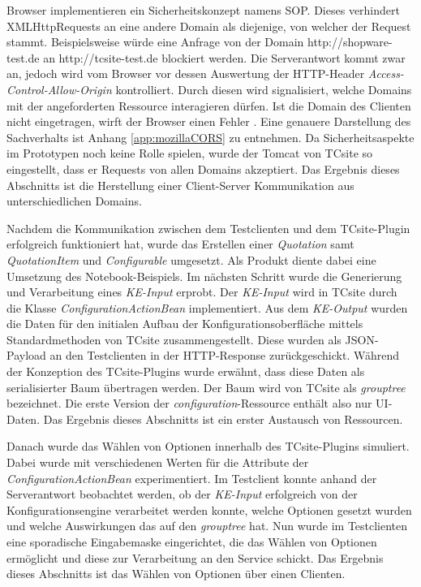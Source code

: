 \documentclass[11pt, a4paper, titlepage, listof=totoc, bibliography=totoc, index=totoc, twoside, openright, headings=normal, draft]{scrreprt}
\begin{document}
Browser implementieren ein Sicherheitskonzept namens \ac{SOP}. Dieses verhindert XMLHttpRequests an eine andere Domain als diejenige, von welcher der Request stammt. Beispielsweise würde eine Anfrage von der Domain \glqq http://shopware-test.de\grqq{} an \glqq http://tcsite-test.de\grqq{} blockiert werden. Die Serverantwort kommt zwar an, jedoch wird vom Browser vor dessen Auswertung der HTTP-Header \emph{Access-Control-Allow-Origin} kontrolliert. Durch diesen wird signalisiert, welche Domains mit der angeforderten Ressource interagieren dürfen. Ist die Domain des Clienten nicht eingetragen, wirft der Browser einen Fehler \citep{mozillaCORS}. Eine genauere Darstellung des Sachverhalts ist Anhang \ref{app:mozillaCORS} zu entnehmen. Da Sicherheitsaspekte im Prototypen noch keine Rolle spielen, wurde der Tomcat von TCsite so eingestellt, dass er Requests von allen Domains akzeptiert. Das Ergebnis dieses Abschnitts ist die Herstellung einer Client-Server Kommunikation aus unterschiedlichen Domains.

Nachdem die Kommunikation zwischen dem Testclienten und dem TCsite-Plugin erfolgreich funktioniert hat, wurde das Erstellen einer \emph{Quotation} samt \emph{QuotationItem} und \emph{Configurable} umgesetzt. Als Produkt diente dabei eine Umsetzung des Notebook-Beispiels. Im nächsten Schritt wurde die Generierung und Verarbeitung eines \emph{KE-Input} erprobt. Der \emph{KE-Input} wird in TCsite durch die Klasse \emph{ConfigurationActionBean} implementiert. Aus dem \emph{KE-Output} wurden die Daten für den initialen Aufbau der Konfigurationsoberfläche mittels Standardmethoden von TCsite zusammengestellt. Diese wurden als JSON-Payload an den Testclienten in der HTTP-Response zurückgeschickt. Während der Konzeption des TCsite-Plugins wurde erwähnt, dass diese Daten als serialisierter Baum übertragen werden. Der Baum wird von TCsite als \emph{grouptree} bezeichnet. Die erste Version der \emph{configuration}-Ressource enthält also nur UI-Daten. Das Ergebnis dieses Abschnitts ist ein erster Austausch von Ressourcen.

Danach wurde das Wählen von Optionen innerhalb des TCsite-Plugins simuliert. Dabei wurde mit verschiedenen Werten für die Attribute der \emph{ConfigurationActionBean} experimentiert. Im Testclient konnte anhand der Serverantwort beobachtet werden, ob der \emph{KE-Input} erfolgreich von der Konfigurationsengine verarbeitet werden konnte, welche Optionen gesetzt wurden und welche Auswirkungen das auf den \emph{grouptree} hat. Nun wurde im Testclienten eine sporadische Eingabemaske eingerichtet, die das Wählen von Optionen ermöglicht und diese zur Verarbeitung an den Service schickt. Das Ergebnis dieses Abschnitts ist das Wählen von Optionen über einen Clienten.
\end{document}
